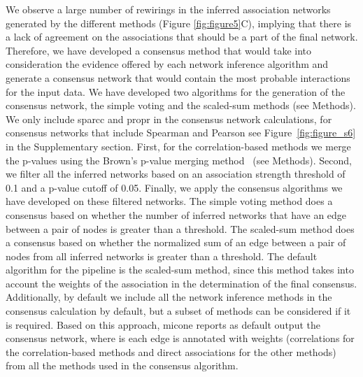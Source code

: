   We observe a large number of rewirings in the inferred association networks generated by the different methods (Figure \ref{fig:figure5}C), implying that there is a lack of agreement on the associations that should be a part of the final network.
  Therefore, we have developed a consensus method that would take into consideration the evidence offered by each network inference algorithm and generate a consensus network that would contain the most probable interactions for the input data.
  We have developed two algorithms for the generation of the consensus network, the simple voting and the scaled-sum methods (see Methods).
  We only include \ac{sparcc} and propr in the consensus network calculations, for consensus networks that include Spearman and Pearson see Figure~\ref{fig:figure_s6} in the Supplementary section.
  First, for the correlation-based methods we merge the p-values using the Brown's p-value merging method~\cite{Poole_Gibbs_Shmulevich_Bernard_Knijnenburg_2016,faustCoNetAppInference2016} (see Methods).
  Second, we filter all the inferred networks based on an association strength threshold of 0.1 and a p-value cutoff of 0.05.
  Finally, we apply the consensus algorithms we have developed on these filtered networks.
  The simple voting method does a consensus based on whether the number of inferred networks that have an edge between a pair of nodes is greater than a threshold.
  The scaled-sum method does a consensus based on whether the normalized sum of an edge between a pair of nodes from all inferred networks is greater than a threshold.
  The default algorithm for the pipeline is the scaled-sum method, since this method takes into account the weights of the association in the determination of the final consensus.
  Additionally, by default we include all the network inference methods in the consensus calculation by default, but a subset of methods can be considered if it is required.
  Based on this approach, \ac{micone} reports as default output the consensus network, where is each edge is annotated with weights (correlations for the correlation-based methods and direct associations for the other methods) from all the methods used in the consensus algorithm.

